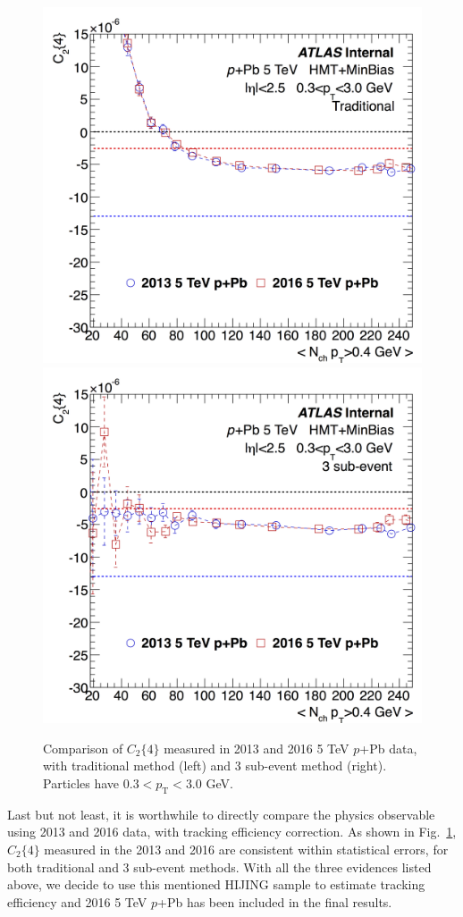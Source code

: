 \begin{figure}[H]
\centering
\includegraphics[width=0.45\linewidth]{figs/sec_evtSlc/MC_pPb5_ev3_mtd0}
\includegraphics[width=0.45\linewidth]{figs/sec_evtSlc/MC_pPb5_ev3_mtd1}
\caption{Comparison of $C_{2}\{4\}$ measured in 2013 and 2016 5 TeV $p$+Pb data, with traditional method (left) and 3 sub-event method (right). Particles have $0.3<p_{\text{T}}<3.0$ GeV.}
\label{fig:MC_pPb5_ev3}
\end{figure}
Last but not least, it is worthwhile to directly compare the physics observable using 2013 and 2016 data, with tracking efficiency correction. As shown in Fig.~\ref{fig:MC_pPb5_ev3}, $C_{2}\{4\}$ measured in the 2013 and 2016 are consistent within statistical errors, for both traditional and 3 sub-event methods. With all the three evidences listed above, we decide to use this mentioned HIJING sample to estimate tracking efficiency and 2016 5 TeV $p$+Pb has been included in the final results.


















